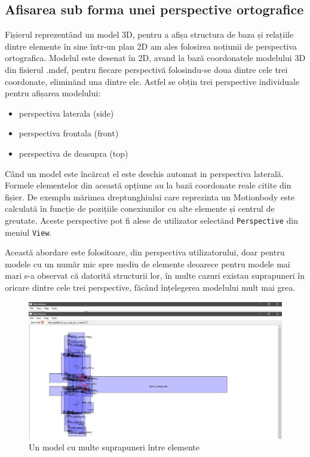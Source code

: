 \subsection{Afisarea sub forma unei perspective ortografice}
Fișierul reprezentând un model 3D, pentru a afișa structura de baza și relațiile dintre elemente în sine într-un plan 2D am 
ales folosirea noțiunii de perspectiva ortografica. Modelul este desenat în 2D, avand la bază coordonatele modelului
3D din fisierul .mdef, pentru fiecare perspectivă folosindu-se doua dintre cele trei coordonate, eliminănd una dintre ele. 
Astfel se obțin trei perspective individuale pentru afișarea modelului:

\begin{itemize}
    \item perspectiva laterala (side)
    \item perspectiva frontala (front)
    \item perspectiva de deasupra (top)
\end{itemize} 

Când un model este încărcat el este deschis automat in perspectiva laterală.
Formele elementelor din această opțiune au la bază coordonate reale citite din fișier. De exemplu mărimea dreptunghiului 
care reprezinta un Motionbody este calculată în funcție de pozițiile conexiunilor cu alte elemente și centrul de 
greutate. Aceste perspective pot fi alese de utilizator selectănd \verb|Perspective| din meniul \verb|View|. \newline

Această abordare este folositoare, din perspectiva utilizatorului, doar pentru modele cu un număr mic spre mediu de elemente 
deoarece pentru modele mai mari s-a observat că datorită structurii lor, în multe cazuri existau suprapuneri în oricare dintre 
cele trei perspective, făcând înțelegerea modelului mult mai grea.\newline 

\begin{figure}[h]
    \includegraphics[width=\linewidth]{imagini/implementare/overlapping.png}
    \caption{Un model cu multe suprapuneri între elemente}
    \label{fig:tabs}
\end{figure}

